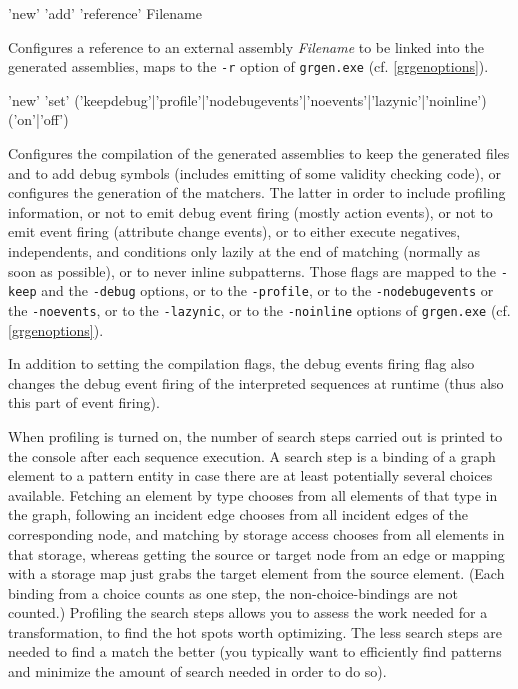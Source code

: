 \begin{rail}
  'new' 'add' 'reference' Filename
\end{rail}
Configures a reference to an external assembly \emph{Filename} to be linked into the generated assemblies, maps to the \texttt{-r} option of \texttt{grgen.exe} (cf. \ref{grgenoptions}).

\begin{rail}
  'new' 'set' ('keepdebug'|'profile'|'nodebugevents'|'noevents'|'lazynic'|'noinline') ('on'|'off')
\end{rail}
Configures the compilation of the generated assemblies to keep the generated files and to add debug symbols (includes emitting of some validity checking code),
or configures the generation of the matchers.
The latter in order to 
include profiling information,
or not to emit debug event firing (mostly action events),
or not to emit event firing (attribute change events),
or to either execute negatives, independents, and conditions only lazily at the end of matching (normally as soon as possible),
or to never inline subpatterns.
Those flags are mapped to the \texttt{-keep} and the \texttt{-debug} options, or to the \texttt{-profile}, or to the \texttt{-nodebugevents} or the \texttt{-noevents}, or to the \texttt{-lazynic}, or to the \texttt{-noinline} options of \texttt{grgen.exe} (cf. \ref{grgenoptions}).

In addition to setting the compilation flags, the debug events firing flag also changes the debug event firing of the interpreted sequences at runtime (thus also this part of event firing).

When profiling is turned on, the number of search steps carried out is printed to the console after each sequence execution.
A search step is a binding of a graph element to a pattern entity in case there are at least potentially several choices available.
Fetching an element by type chooses from all elements of that type in the graph, following an incident edge chooses from all incident edges of the corresponding node, and matching by storage access chooses from all elements in that storage, whereas getting the source or target node from an edge or mapping with a storage map just grabs the target element from the source element.
(Each binding from a choice counts as one step, the non-choice-bindings are not counted.)
Profiling the search steps allows you to assess the work needed for a transformation, to find the hot spots worth optimizing.
The less search steps are needed to find a match the better (you typically want to efficiently find patterns and minimize the amount of search needed in order to do so). 

